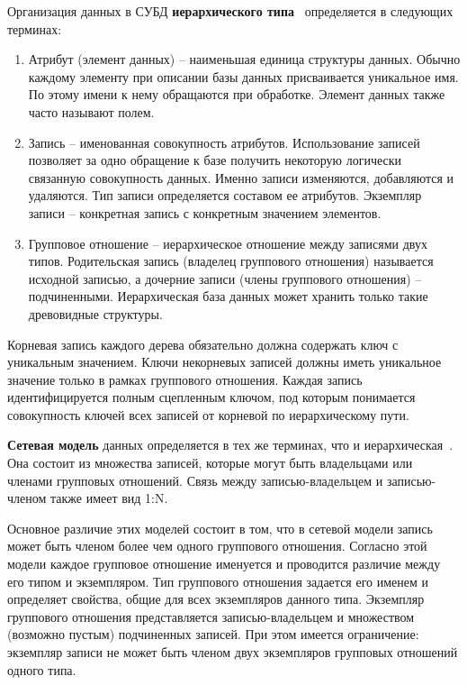 Организация данных в СУБД \textbf{иерархического типа}~\cite{db_models} определяется в следующих терминах:
\begin{enumerate}
	\item Атрибут (элемент данных) -- наименьшая единица структуры данных.
	Обычно каждому элементу при описании базы данных присваивается уникальное имя. 
	По этому имени к нему обращаются при обработке. 
	Элемент данных также часто называют полем.
	\item Запись -- именованная совокупность атрибутов.
	Использование записей позволяет за одно обращение к базе получить некоторую логически связанную совокупность данных. 
	Именно записи изменяются, добавляются и удаляются. 
	Тип записи определяется составом ее атрибутов. 
	Экземпляр записи -- конкретная запись с конкретным значением элементов.
	\item Групповое отношение -- иерархическое отношение между записями двух типов. 
	Родительская запись (владелец группового отношения) называется исходной записью, а дочерние записи (члены группового отношения) -- подчиненными. 
	Иерархическая база данных может хранить только такие древовидные структуры.
\end{enumerate}

Корневая запись каждого дерева обязательно должна содержать ключ с уникальным значением. 
Ключи некорневых записей должны иметь уникальное значение только в рамках группового отношения. 
Каждая запись идентифицируется полным сцепленным ключом, под которым понимается совокупность ключей всех записей от корневой по иерархическому пути.

\textbf{Сетевая модель} данных определяется в тех же терминах, что и иерархическая~\cite{db_models}. 
Она состоит из множества записей, которые могут быть владельцами или членами групповых отношений. 
Связь между записью-владельцем и записью-членом также имеет вид 1:N.

Основное различие этих моделей состоит в том, что в сетевой модели запись может быть членом более чем одного группового отношения. 
Согласно этой модели каждое групповое отношение именуется и проводится различие между его типом и экземпляром. 
Тип группового отношения задается его именем и определяет свойства, общие для всех экземпляров данного типа. 
Экземпляр группового отношения представляется записью-владельцем и множеством (возможно пустым) подчиненных записей.
При этом имеется ограничение: экземпляр записи не может быть членом двух экземпляров групповых отношений одного типа.

